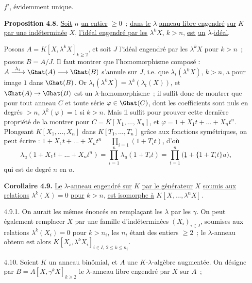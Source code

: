 
\(f'\),
évidemment unique.

\textbf{Proposition 4.8.} \uline{Soit} \(n\) \uline{un entier} \(\ge0\)~; \uline{dans le} \(\lambda\)-\uline{anneau libre engendré} \uline{sur} \(K\) \uline{par une indéterminée} \(X\), \uline{l'idéal engendré par les} \(\lambda^k X\), \(k>n\), \uline{est} \uline{un} \(\lambda\)-\uline{idéal}.

Posons \(A=K[X,\lambda^k X]_{k\ge2}\), et soit \(J\) l'idéal engendré par les \(\lambda^k X\) pour \(k>n\)~; posons \(B=A/J\). Il faut montrer que l'homomorphisme composé : \(A\xrightarrow{\ \lambda_t\ }\Ghat(A)\longrightarrow\Ghat(B)\) s'annule sur \(J\), i.e. que \(\lambda_t(\lambda^k X)\), \(k>n\), a pour image \(1\) dans \(\Ghat(B)\). Or \(\lambda_t(\lambda^k X)=\lambda^k(\lambda_t(X))\), et \(\Ghat(A)\to\Ghat(B)\) est un \(\lambda\)-homomorphisme~; il suffit donc de montrer que pour tout anneau \(C\) et toute série \(\varphi\in\Ghat(C)\), dont les coefficients sont nuls en degrés \(>n\), \(\lambda^k(\varphi)=1\) si \(k>n\). Mais il suffit pour prouver cette dernière propriété de la montrer pour \(C=K[X_1,\ldots,X_n]\), et \(\varphi=1+X_1t+\ldots+X_nt^n\). Plongeant \(K[X_1,\ldots,X_n]\) dans \(K[T_1,\ldots,T_n]\) grâce aux fonctions symétriques, on peut écrire : \(1+X_1t+\ldots+X_nt^n=\prod_{i=1}(1+T_it)\), d'où
\[
  \lambda_u(1+X_1t+\ldots+X_nt^n)=\prod_{i=1}^{n}\lambda_u(1+T_it)=\prod_{i=1}^{n}\bigl(\underline{1}+\{1+T_it\}u\bigr),
\]
qui est de degré \(n\) en \(u\).

\textbf{Corollaire 4.9.} \uline{Le} \(\lambda\)-\uline{anneau engendré sur} \(K\) \uline{par le générateur} \(X\) \uline{soumis aux relations} \(\lambda^k(X)=0\) \uline{pour} \(k>n\), \uline{est isomorphe à} \(K[X,\ldots,\lambda^n X]\).

4.9.1. On aurait les mêmes énoncés en remplaçant les \(\lambda\) par les \(\gamma\). On peut également remplacer \(X\) par une famille d'indéterminées \((X_i)_{i\in I}\), soumises aux relations \(\lambda^k(X_i)=0\) pour \(k>n_i\), les \(n_i\) étant des entiers \(\ge2\)~; le \(\lambda\)-anneau obtenu est alors \(K[X_i,\lambda^k X_i]_{i\in I,\ 2\le k\le n_i}\).

4.10. Soient \(K\) un anneau binômial, et \(A\) une \(K\)-\(\lambda\)-algèbre augmentée. On désigne par \(B=A[X,\gamma^k X]_{k\ge2}\) le \(\lambda\)-anneau libre engendré par \(X\) sur \(A\)~; 
